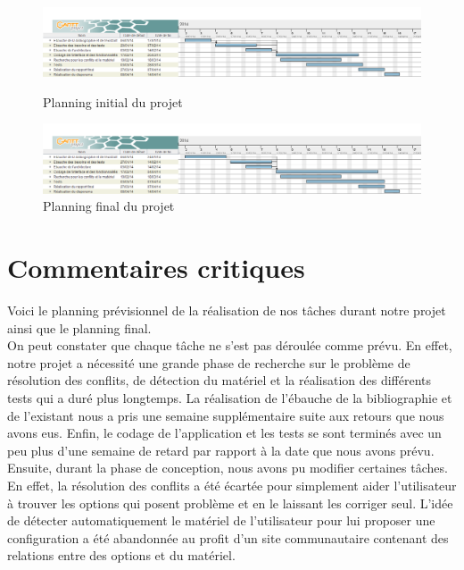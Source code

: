 \documentclass[17pts]{report}
\begin{document}
\begin{figure}
    \includegraphics[scale=0.5]{./illustrations/planning_initial_pdp.png}
    \centering
    \caption{Planning initial du projet}
    \label{fig:PlanningInitial}
    \vspace{10.00mm}
    \includegraphics[scale=0.5]{./illustrations/planning_final_pdp.png}
    \centering
    \caption{Planning final du projet}
    \label{fig:PlanningFinal}
\end{figure}

\newpage
\chapter*{Commentaires critiques}\thispagestyle{IHA-fancy-style}

Voici le planning prévisionnel de la réalisation de nos tâches durant notre
projet ainsi que le planning final.  \\

On peut constater que chaque tâche ne s'est pas déroulée comme prévu.  En
effet, notre projet a nécessité une grande phase de recherche sur le problème
de résolution des conflits, de détection du matériel et la réalisation des
différents tests qui a duré plus longtemps.  La réalisation de l'ébauche de la
bibliographie et de l'existant nous a pris une semaine supplémentaire suite aux
retours que nous avons eus. Enfin, le codage de l'application et les tests se
sont terminés avec un peu plus d'une semaine de retard par rapport à la date
que nous avons prévu.  \\

Ensuite, durant la phase de conception, nous avons pu modifier certaines
tâches. En effet, la résolution des conflits a été écartée pour simplement
aider l'utilisateur à trouver les options qui posent problème et en le laissant
les corriger seul. L'idée de détecter automatiquement le matériel de
l'utilisateur pour lui proposer une configuration a été abandonnée au profit
d'un site communautaire contenant des relations entre des options et du
matériel.
\end{document}
